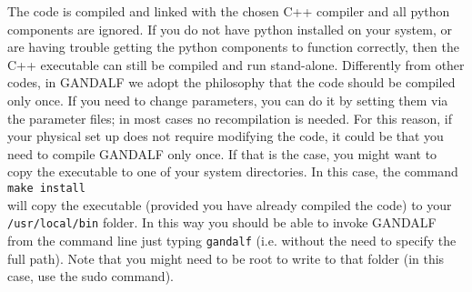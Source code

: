 \documentclass[a4paper]{article}
\newcommand{\var}[1]{\texttt{#1}}
\begin{document}
\noindent The code is compiled and linked with the chosen C++ compiler and all python components are ignored.  If you do not have python installed on your system, or are having trouble getting the python components to function correctly, then the C++ executable can still be compiled and run stand-alone. Differently from other codes, in GANDALF we adopt the philosophy that the code should be compiled only once. If you need to change parameters, you can do it by setting them via the parameter files; in most cases no recompilation is needed. For this reason, if your physical set up does not require modifying the code, it could be that you need to compile GANDALF only once. If that is the case, you might want to copy the executable to one of your system directories. In this case, the command\\
\newline
\noindent \var{make install} \\

will copy the executable (provided you have already compiled the code) to your \var{/usr/local/bin} folder. In this way you should be able to invoke GANDALF from the command line just typing \var{gandalf} (i.e. without the need to specify the full path). Note that you might need to be root to write to that folder (in this case, use the sudo command).


\end{document}

